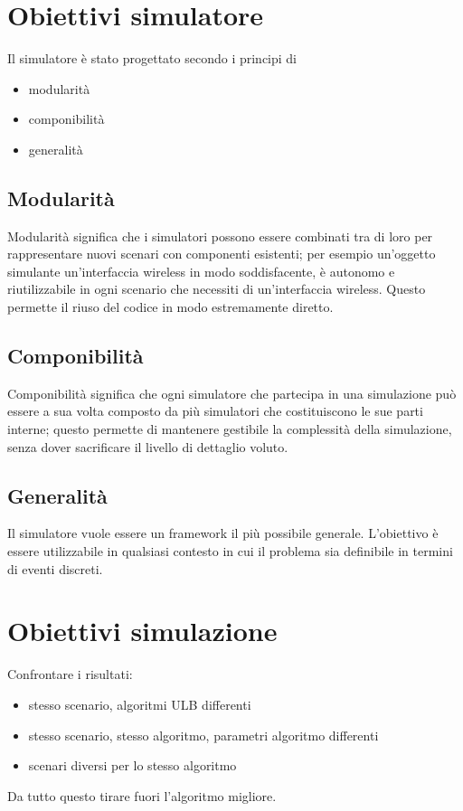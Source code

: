 \documentclass[12pt,a4paper,openright,twoside]{book}
\begin{document}
\section{Obiettivi simulatore}
Il simulatore è stato progettato secondo i principi di
\begin{itemize}
\item modularità
\item componibilità
\item generalità
\end{itemize}

\subsection{Modularità}
Modularità significa che i simulatori possono essere combinati tra di
loro per rappresentare nuovi scenari con componenti esistenti; per
esempio un'oggetto simulante un'interfaccia wireless in modo
soddisfacente, è autonomo e riutilizzabile in ogni scenario che
necessiti di un'interfaccia wireless. Questo permette il riuso del
codice in modo estremamente diretto.

\subsection{Componibilità}
Componibilità significa che ogni simulatore che partecipa in una
simulazione può essere a sua volta composto da più simulatori che
costituiscono le sue parti interne; questo permette di mantenere
gestibile la complessità della simulazione, senza dover sacrificare il
livello di dettaglio voluto.

\subsection{Generalità}
Il simulatore vuole essere un framework il più possibile
generale. L'obiettivo è essere utilizzabile in qualsiasi contesto in
cui il problema sia definibile in termini di eventi discreti.


\section{Obiettivi simulazione}
Confrontare i risultati:
\begin{itemize}
\item stesso scenario, algoritmi ULB differenti
\item stesso scenario, stesso algoritmo, parametri algoritmo differenti
\item scenari diversi per lo stesso algoritmo
\end{itemize}
Da tutto questo tirare fuori l'algoritmo migliore.
\end{document}
